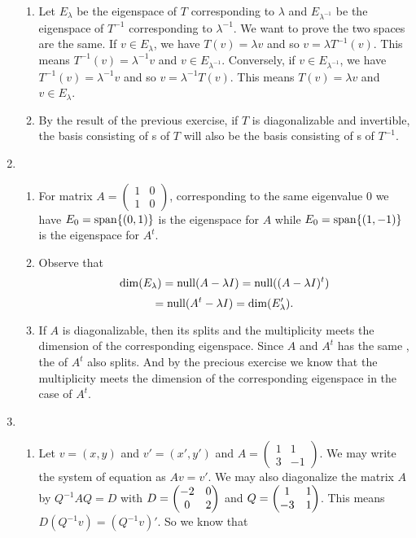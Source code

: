 \begin{enumerate}
\begin{enumerate}
\item Let $E_{\lambda}$ be the eigenspace of $T$ corresponding to $\lambda$ and $E_{\lambda^{-1}}$ be the eigenspace of $T^{-1}$ corresponding to $\lambda^{-1}$. We want to prove the two spaces are the same. If $v\in E_{\lambda}$, we have $T(v)=\lambda v$ and so $v=\lambda T^{-1}(v)$. This means $T^{-1}(v)=\lambda^{-1}v$ and $v\in E_{\lambda^{-1}}$. Conversely, if $v\in E_{\lambda^{-1}}$, we have $T^{-1}(v)=\lambda^{-1}v$ and so $v=\lambda^{-1} T(v)$. This means $T(v)=\lambda v$ and $v\in E_{\lambda}$.
\item By the result of the previous exercise, if $T$ is diagonalizable and invertible, the basis consisting of \egve s of $T$ will also be the basis consisting of \egve s of $T^{-1}$.
\end{enumerate}
\item \begin{enumerate}
\item For matrix $A=\begin{pmatrix}1&0\\1&0\end{pmatrix}$, corresponding to the same eigenvalue $0$ we have $E_0=\sp\{(0,1)\}$ is the eigenspace for $A$ while $E_0=\sp\{(1,-1)\}$ is the eigenspace for $A^t$.
\item Observe that 
\[\dim(E_\lambda)=\nul(A-\lambda I)=\nul((A-\lambda I)^t)\]
\[=\nul(A^t-\lambda I)=\dim(E_\lambda').\]
\item If $A$ is diagonalizable, then its \charpoly{} splits and the multiplicity meets the dimension of the corresponding eigenspace. Since $A$ and $A^t$ has the same \charpoly{}, the \charpoly{} of $A^t$ also splits. And by the precious exercise we know that the multiplicity meets the dimension of the corresponding eigenspace in the case of $A^t$.
\end{enumerate}
\item \begin{enumerate}
\item Let $v=(x,y)$ and $v'=(x',y')$ and $A=\begin{pmatrix}1&1\\3&-1\end{pmatrix}$. We may write the system of equation as $Av=v'$. We may also diagonalize the matrix $A$ by $Q^{-1}AQ=D$ with $D=\begin{pmatrix}-2 & 0\cr 0 & 2\end{pmatrix}$ and $Q=\begin{pmatrix}1 & 1\cr -3 & 1\end{pmatrix}$. This means $D(Q^{-1}v)=(Q^{-1}v)'$. So we know that 

\end{enumerate}
\end{enumerate}
